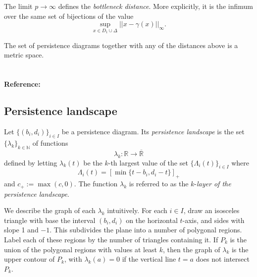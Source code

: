 \documentclass{amsart}
\begin{document}
	The limit $p \to \infty$ defines the \textit{bottleneck distance}. More explicitly, it is the infimum over the same set of bijections of the value
	\begin{equation*}
	\sup_{x \in D_1 \cup \Delta} ||x - \gamma(x)||_{\infty}.
	\end{equation*}

	The set of persistence diagrams together with any of the distances above is a
	metric space.
	
	\paragraph{\\ Reference:} \cite{kerber2017geometry}
	
	\subsection*{Persistence landscape} \label{persistence_landscape}	
	
	Let $\{(b_i, d_i)\}_{i \in I}$ be a 
	persistence diagram. Its \textit{persistence landscape} is the set $\{\lambda_k\}_{k \in \mathbb N}$ of functions	
	\begin{equation*}	
	\lambda_k : \mathbb R \to \overline{\mathbb R}	
	\end{equation*}	
	defined by letting $\lambda_k(t)$ be the $k$-th largest value of the set $\{\Lambda_i(t)\}_ {i \in I}$ where	
	\begin{equation*}	
	\Lambda_i(t) = \left[ \min \{t-b_i, d_i-t\}\right]_+	
	\end{equation*}	
	and $c_+ := \max(c,0)$. The function $\lambda_k$ is referred to as the $k$-\textit{layer of the persistence landscape}.
	
	We describe the graph of each $\lambda_k$ intuitively. For each $i \in I$, draw an isosceles triangle with base the interval $(b_i, d_i)$ on the horizontal $t$-axis, and sides with slope 1 and $-1$. This subdivides the plane into a number of polygonal regions. Label each of these regions by the number of triangles containing it. If $P_k$ is the union of the polygonal regions with values at least $k$, then the graph of $\lambda_k$ is the upper contour of $P_k$, with $\lambda_k(a) = 0$ if the vertical line $t=a$ does not intersect $P_k$.
	
\end{document}
